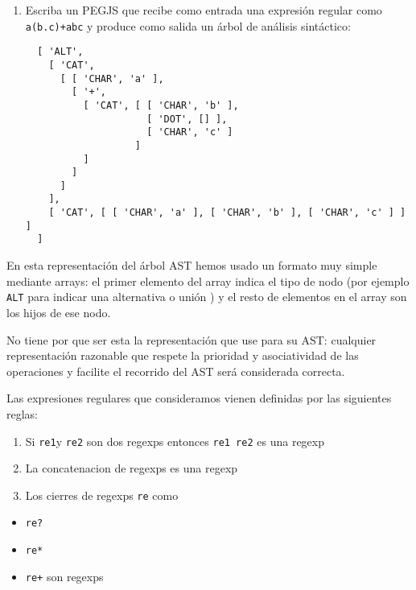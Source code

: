 \begin{enumerate}
\def\labelenumi{\arabic{enumi}.}
\item
  Escriba un PEGJS que recibe como entrada una expresión regular como
  \texttt{a(b.c)+\textbar{}abc} y produce como salida un árbol de
  análisis sintáctico:

\begin{verbatim}
  [ 'ALT',
    [ 'CAT',
      [ [ 'CHAR', 'a' ],
        [ '+',
          [ 'CAT', [ [ 'CHAR', 'b' ], 
                     [ 'DOT', [] ], 
                     [ 'CHAR', 'c' ] 
                   ] 
          ] 
        ] 
      ] 
    ],
    [ 'CAT', [ [ 'CHAR', 'a' ], [ 'CHAR', 'b' ], [ 'CHAR', 'c' ] ] ] 
  ]
\end{verbatim}
\end{enumerate}

En esta representación del árbol AST hemos usado un formato muy simple
mediante arrays: el primer elemento del array indica el tipo de nodo
(por ejemplo \texttt{\textquotesingle{}ALT\textquotesingle{}} para
indicar una alternativa o unión ) y el resto de elementos en el array
son los hijos de ese nodo.

No tiene por que ser esta la representación que use para su AST:
cualquier representación razonable que respete la prioridad y
asociatividad de las operaciones y facilite el recorrido del AST será
considerada correcta.

Las expresiones regulares que consideramos vienen definidas por las
siguientes reglas:

\begin{enumerate}
\def\labelenumi{\arabic{enumi}.}
\itemsep1pt\parskip0pt
\item
  Si \texttt{re1}y \texttt{re2} son dos regexps entonces
  \texttt{re1 \textbar{} re2} es una regexp
\item
  La concatenacion de regexps es una regexp
\item
  Los cierres de regexps \texttt{re} como
\end{enumerate}

\begin{itemize}
\itemsep1pt\parskip0pt
\item
  \texttt{re?}
\item
  \texttt{re*}
\item
  \texttt{re+} son regexps
\end{itemize}

